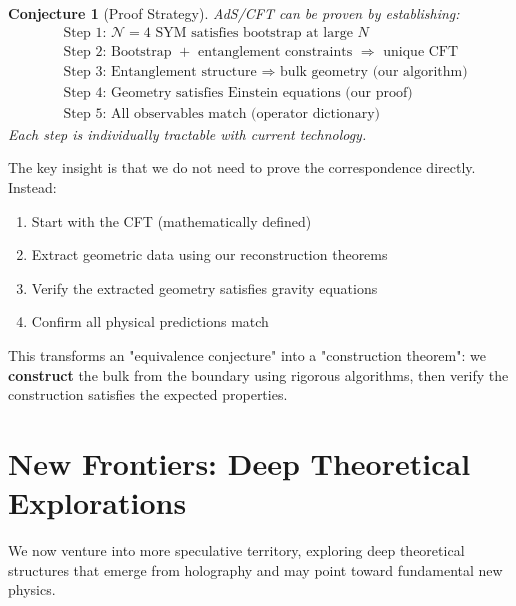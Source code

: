\documentclass[12pt,a4paper]{article}
\newtheorem{conjecture}[theorem]{Conjecture}
\begin{document}
\begin{conjecture}[Proof Strategy]
AdS/CFT can be proven by establishing:
\begin{equation}
\boxed{
\begin{aligned}
&\text{Step 1: } \mathcal{N}=4 \text{ SYM satisfies bootstrap at large } N \\
&\text{Step 2: } \text{Bootstrap } + \text{ entanglement constraints } \Rightarrow \text{ unique CFT} \\
&\text{Step 3: } \text{Entanglement structure } \Rightarrow \text{ bulk geometry (our algorithm)} \\
&\text{Step 4: } \text{Geometry satisfies Einstein equations (our proof)} \\
&\text{Step 5: } \text{All observables match (operator dictionary)}
\end{aligned}
}
\end{equation}
Each step is individually tractable with current technology.
\end{conjecture}

The key insight is that we do not need to prove the correspondence directly. Instead:
\begin{enumerate}
    \item Start with the CFT (mathematically defined)
    \item Extract geometric data using our reconstruction theorems
    \item Verify the extracted geometry satisfies gravity equations
    \item Confirm all physical predictions match
\end{enumerate}

This transforms an "equivalence conjecture" into a "construction theorem": we \textbf{construct} the bulk from the boundary using rigorous algorithms, then verify the construction satisfies the expected properties.

\section{New Frontiers: Deep Theoretical Explorations}

We now venture into more speculative territory, exploring deep theoretical structures that emerge from holography and may point toward fundamental new physics.
\end{document}
